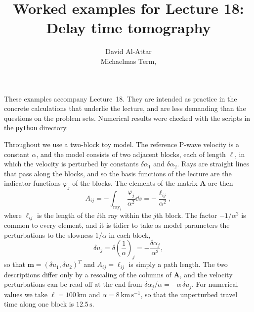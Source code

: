 \documentclass[a4paper,12pt]{paper}
\title{Worked examples for Lecture 18: Delay time tomography}
\author{David Al-Attar \\ Michaelmas Term, \the\year}
\newcounter{example}
\begin{document}
\maketitle

\noindent These examples accompany Lecture~18. They are intended as practice in the concrete
calculations that underlie the lecture, and are less demanding than the questions on the
problem sets. Numerical results were checked with the scripts in the \texttt{python}
directory.

\medskip

\noindent Throughout we use a two-block toy model. The reference P-wave velocity is a constant
$\alpha$, and the model consists of two adjacent blocks, each of length $\ell$, in which the
velocity is perturbed by constants $\delta\alpha_{1}$ and $\delta\alpha_{2}$. Rays are straight
lines that pass along the blocks, and so the basis functions of the lecture are the indicator
functions $\varphi_{j}$ of the blocks. The elements of the matrix $\mathbf{A}$ are then
\begin{equation}
    A_{ij} = -\int_{\mathrm{ray}_{i}} \frac{\varphi_{j}}{\alpha^{2}} \dd s = -\frac{\ell_{ij}}{\alpha^{2}},
    \label{eq:1}
\end{equation}
where $\ell_{ij}$ is the length of the $i$th ray within the $j$th block. The factor $-1/\alpha^{2}$ is
common to every element, and it is tidier to take as model parameters the perturbations to the
slowness $1/\alpha$ in each block,
\begin{equation}
    \delta u_{j} = \delta\!\left(\frac{1}{\alpha}\right)_{j} = -\frac{\delta\alpha_{j}}{\alpha^{2}},
    \label{eq:2}
\end{equation}
so that $\mathbf{m}=(\delta u_{1},\delta u_{2})^{T}$ and $A_{ij}=\ell_{ij}$ is simply a path length.
The two descriptions differ only by a rescaling of the columns of $\mathbf{A}$, and the velocity
perturbations can be read off at the end from $\delta\alpha_{j}/\alpha = -\alpha\,\delta u_{j}$.
For numerical values we take $\ell = 100\,\mathrm{km}$ and $\alpha = 8\,\mathrm{km\,s^{-1}}$, so
that the unperturbed travel time along one block is $12.5\,\mathrm{s}$.
\end{document}
